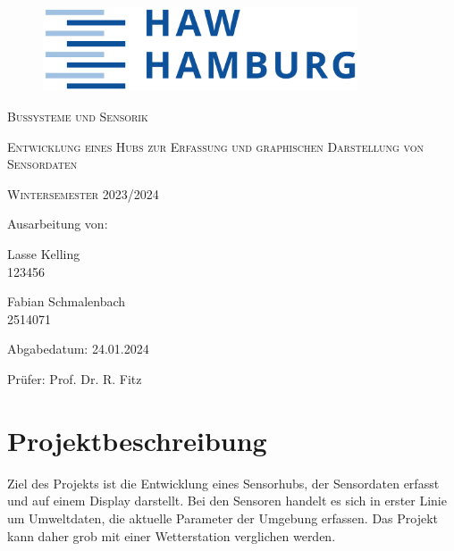\documentclass[a4paper,11pt]{article}
\begin{document}
\begin{titlepage}

  \begin{figure}
    \centering
    \includegraphics[height=2.5cm]{HAWLogo}
  \end{figure}

  \vspace*{2cm}
  \centering
  {\scshape\Large Bussysteme und Sensorik \par}
  \vspace{1cm}
  {\scshape\LARGE Entwicklung eines Hubs zur Erfassung und graphischen Darstellung von Sensordaten \par}
  \vspace{0.5cm}
  {\scshape\large Wintersemester 2023/2024 \par}
  \vspace{5cm}

  \raggedright
  Ausarbeitung von:

  \vspace{0.5cm}
  Lasse Kelling \\
  123456 %

  \vspace{0.2cm}
  Fabian Schmalenbach \\
  2514071

  \vspace{0.5cm}
  Abgabedatum: 24.01.2024

  \vspace{0.5cm}
  Prüfer: Prof. Dr. R. Fitz



\end{titlepage}

\newpage
{}
\tableofcontents
\thispagestyle{empty}
\newpage

\setcounter{page}{1}    %

\section{Projektbeschreibung}
\label{sub:projektbeschreibung}

Ziel des Projekts ist die Entwicklung eines Sensorhubs, der Sensordaten erfasst und auf einem Display darstellt.
Bei den Sensoren handelt es sich in erster Linie um Umweltdaten, die aktuelle Parameter der Umgebung erfassen.
Das Projekt kann daher grob mit einer Wetterstation verglichen werden.
\end{document}
